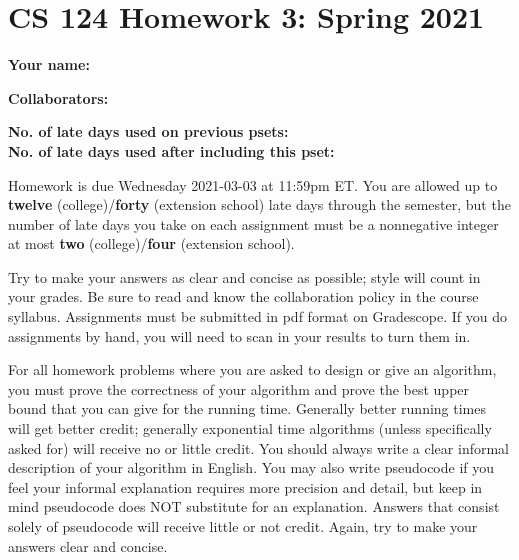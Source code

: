 \documentclass[10pt]{article}
\begin{document}
	
	\section*{CS 124 Homework 3: Spring 2021}
 		
	\textbf{Your name:} 
		
	\textbf{Collaborators:} 

	\textbf{No. of late days used on previous psets: }\\
	\textbf{No. of late days used after including this pset: }

Homework is due Wednesday 2021-03-03 at 11:59pm ET. You are allowed up to {\bf twelve} (college)/{\bf forty} (extension school) late days through the semester, but the number of late days you take on each assignment must be a nonnegative integer at most {\bf two} (college)/{\bf four} (extension school).

Try to make your answers as clear and concise as possible;
style will count in your grades. Be sure to read and know the collaboration policy in the course
syllabus. Assignments must be submitted in pdf format on Gradescope. If you do assignments by hand, you
will need to scan in your results to turn them in. 

For all homework problems where you are asked to design or give an algorithm, you must prove the correctness
of your algorithm and prove the best upper bound that you can give for the running time. Generally
better running times will get better credit; generally exponential time algorithms (unless specifically asked
for) will receive no or little credit. You should always write a clear informal description of your algorithm
in English. You may also write pseudocode if you feel your informal explanation requires more precision
and detail, but keep in mind pseudocode does NOT substitute for an explanation. Answers that consist
solely of pseudocode will receive little or not credit. Again, try to make your answers clear and concise.
\end{document}
